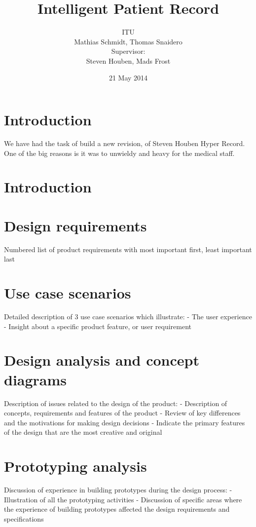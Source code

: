 \documentclass{article}
\title{Intelligent Patient Record}
\author{ITU \\
Mathias Schmidt, Thomas Snaidero \\
Supervisor: \\
Steven Houben, Mads Frost}
\date{21 May 2014}
\begin{document}
\maketitle

\pagebreak

\tableofcontents

\pagebreak


\section{Introduction}
We have had the task of build a new revision, of Steven Houben Hyper Record.
One of the big reasons is it was to unwieldy and heavy for the medical staff.


\section{Introduction}

\section{Design requirements}
Numbered list of product requirements with most important first, least important last

\section{Use case scenarios}
Detailed description of 3 use case scenarios which illustrate:
- The user experience
- Insight about a specific product feature, or user requirement

\section{Design analysis and concept diagrams}
Description of issues related to the design of the product:
- Description of concepts, requirements and features of the product
- Review of key differences and the motivations for making design decisions
- Indicate the primary features of the design that are the most creative and original

\section{Prototyping analysis}
Discussion of experience in building prototypes during the design process:
- Illustration of all the prototyping activities
- Discussion of specific areas where the experience of building prototypes affected the design requirements and specifications
\end{document}
